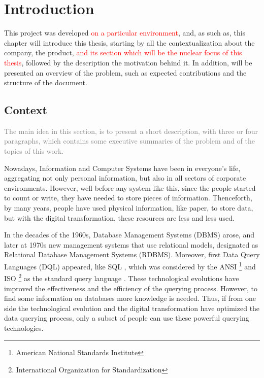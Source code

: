 \newcommand{\novathesis}{\emph{novathesis}}
\newcommand{\novathesisclass}{\texttt{novathesis.cls}}


\chapter{Introduction}
\label{cha:introduction}
This project was developed \textcolor{red}{on a particular environment}, and, as such as, this chapter will introduce this thesis, starting by all the contextualization about the company, the product, \textcolor{red}{and its section which will be the nuclear focus of this thesis}, followed by the description the motivation behind it. In addition, will be presented an overview of the problem, such as expected contributions and the structure of the document. 

\section{Context} 
\label{sec:context}
\textcolor{gray}{The main idea in this section, is to present a short description, with three or four paragraphs, which contains some executive summaries of the problem and of the topics of this work.}

Nowadays, Information and Computer Systems have been in everyone’s life, aggregating not only personal information, but also in all sectors of corporate environments. However, well before any system like this, since the people started to count or write, they have needed to store pieces of information. \cite{historyOfDatabases} Thenceforth, by many years, people have used physical information, like paper, to store data, but with the digital transformation, these resources are less and less used.

In the decades of the 1960s, Database Management Systems (DBMS) arose, and later at 1970s new management systems that use relational models, designated as Relational Database Management Systems (RDBMS). Moreover, first Data Query Languages (DQL) appeared, like SQL \cite{sequel_aStructuredEnglishQueryLanguage}, which was considered by the ANSI \footnote{American National Standards Institute} and ISO \footnote{International Organization for Standardization} as the standard query language \cite{databaseManagementSystems}. These technological evolutions have improved the effectiveness and the efficiency of the querying process. However, to find some information on databases more knowledge is needed. Thus, if from one side the technological evolution and the digital transformation have optimized the data querying process, only a subset of people can use these powerful querying technologies.

